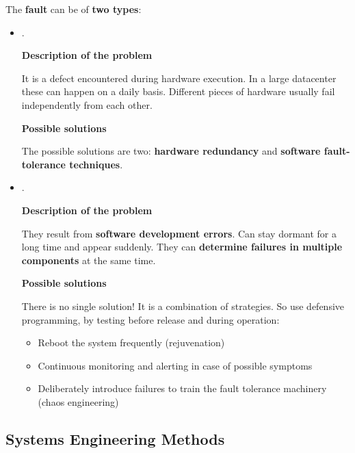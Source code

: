 \noindent
The \textbf{fault} can be of \textbf{two types}:
\begin{itemize}
    \item {}.
    \begin{flushleft}
        \textcolor{Red2}{\textbf{ Description of the problem}}
    \end{flushleft}
    It is a defect encountered during hardware execution. In a large datacenter these can happen on a daily basis. Different pieces of hardware usually fail independently from each other.
    \begin{flushleft}
        \textcolor{Green3}{\textbf{ Possible solutions}}
    \end{flushleft}
    The possible solutions are two: \textbf{hardware redundancy} and \textbf{software fault-tolerance techniques}.

    \item {}.
    \begin{flushleft}
        \textcolor{Red2}{\textbf{ Description of the problem}}
    \end{flushleft}
    They result from \textbf{software development errors}. Can stay dormant for a long time and appear suddenly. They can \textbf{determine failures in multiple components} at the same time.
    \begin{flushleft}
        \textcolor{Green3}{\textbf{ Possible solutions}}
    \end{flushleft}
    There is no single solution! It is a combination of strategies. So use defensive programming, by testing before release and during operation:
    \begin{itemize}
        \item Reboot the system frequently (rejuvenation)
        \item Continuous monitoring and alerting in case of possible symptoms
        \item Deliberately introduce failures to train the fault tolerance machinery (chaos engineering)
    \end{itemize}
\end{itemize}

\longline

\subsection{Systems Engineering Methods}

